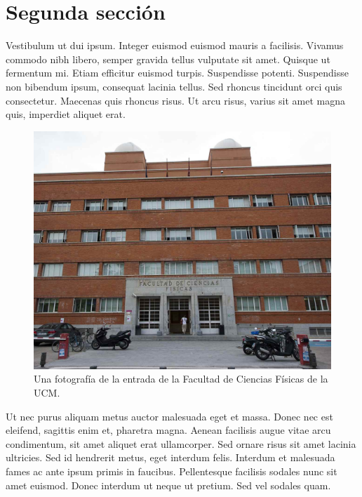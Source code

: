 \documentclass[../preambulo.tex]{subfiles}
\begin{document}
\section{Segunda sección}


Vestibulum ut dui ipsum. Integer euismod euismod mauris a facilisis. Vivamus commodo nibh libero, semper gravida tellus vulputate sit amet. Quisque ut fermentum mi. Etiam efficitur euismod turpis. Suspendisse potenti. Suspendisse non bibendum ipsum, consequat lacinia tellus. Sed rhoncus tincidunt orci quis consectetur. Maecenas quis rhoncus risus. Ut arcu risus, varius sit amet magna quis, imperdiet aliquet erat.


\begin{figure}[H]
	\centering
	\includegraphics[scale=.3]{img/imagen}	%
	\caption{Una fotografía de la entrada de la Facultad de Ciencias Físicas de la UCM.}
	\label{fig:patio}
\end{figure}



Ut nec purus aliquam metus auctor malesuada eget et massa. Donec nec est eleifend, sagittis enim et, pharetra magna. Aenean facilisis augue vitae arcu condimentum, sit amet aliquet erat ullamcorper. Sed ornare risus sit amet lacinia ultricies. Sed id hendrerit metus, eget interdum felis. Interdum et malesuada fames ac ante ipsum primis in faucibus. Pellentesque facilisis sodales nunc sit amet euismod. Donec interdum ut neque ut pretium. Sed vel sodales quam.
\end{document}
